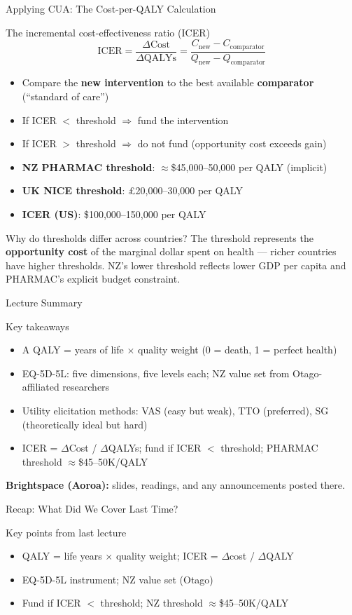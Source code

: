 \documentclass[aspectratio=169, 12pt]{beamer}
\newcommand{\recapslide}[1]{%
  \begin{frame}{Recap: What Did We Cover Last Time?}
    \begin{block}{Key points from last lecture}
      \begin{itemize}#1\end{itemize}
    \end{block}
  \end{frame}}
\newcommand{\summaryside}[1]{%
  \begin{frame}{Lecture Summary}
    \begin{exampleblock}{Key takeaways}
      \begin{itemize}#1\end{itemize}
    \end{exampleblock}
    \vspace{0.5em}
    {\footnotesize\textcolor{OtagoGold}{\textbf{Brightspace (Aoroa):}} slides, readings, and any announcements posted there.}
  \end{frame}}
\begin{document}
\begin{frame}{Applying CUA: The Cost-per-QALY Calculation}
  \begin{block}{The incremental cost-effectiveness ratio (ICER)}
    $$\text{ICER} = \frac{\Delta \text{Cost}}{\Delta \text{QALYs}} = \frac{C_{\text{new}} - C_{\text{comparator}}}{Q_{\text{new}} - Q_{\text{comparator}}}$$
  \end{block}
  \vspace{0.3em}
  \begin{itemize}
    \item Compare the \textbf{new intervention} to the best available \textbf{comparator}
          (``standard of care'')
    \item If ICER $<$ threshold $\Rightarrow$ fund the intervention
    \item If ICER $>$ threshold $\Rightarrow$ do not fund (opportunity cost exceeds gain)
    \item \textbf{NZ PHARMAC threshold}: $\approx$\$45,000--50,000 per QALY (implicit)
    \item \textbf{UK NICE threshold}: £20,000--30,000 per QALY
    \item \textbf{ICER (US)}: \$100,000--150,000 per QALY
  \end{itemize}
  \begin{exampleblock}{Why do thresholds differ across countries?}
    The threshold represents the \textbf{opportunity cost} of the marginal dollar spent on
    health --- richer countries have higher thresholds. NZ's lower threshold reflects lower GDP
    per capita and PHARMAC's explicit budget constraint.
  \end{exampleblock}
\end{frame}

\summaryside{
  \item A QALY = years of life $\times$ quality weight (0 = death, 1 = perfect health)
  \item EQ-5D-5L: five dimensions, five levels each; NZ value set from Otago-affiliated researchers
  \item Utility elicitation methods: VAS (easy but weak), TTO (preferred), SG (theoretically ideal but hard)
  \item ICER = $\Delta$Cost / $\Delta$QALYs; fund if ICER $<$ threshold; PHARMAC threshold $\approx$\$45--50K/QALY
}

\recapslide{
  \item QALY = life years $\times$ quality weight; ICER = $\Delta$cost / $\Delta$QALY
  \item EQ-5D-5L instrument; NZ value set (Otago)
  \item Fund if ICER $<$ threshold; NZ threshold $\approx$\$45--50K/QALY
}
\end{document}
